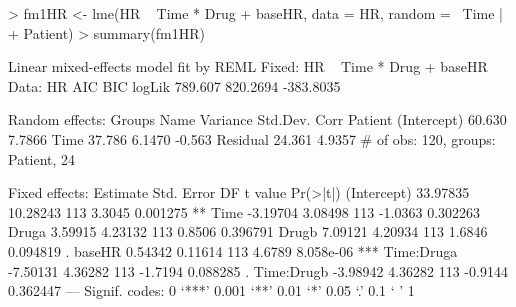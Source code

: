 \documentclass[12pt]{article}
\begin{document}
\begin{Schunk}
\begin{Sinput}
> fm1HR <- lme(HR ~ Time * Drug + baseHR, data = HR, random = ~Time | 
+     Patient)
> summary(fm1HR)
\end{Sinput}
\begin{Soutput}
Linear mixed-effects model fit by REML
Fixed: HR ~ Time * Drug + baseHR 
 Data: HR 
     AIC      BIC    logLik
 789.607 820.2694 -383.8035

Random effects:
 Groups   Name        Variance Std.Dev. Corr   
 Patient  (Intercept) 60.630   7.7866          
          Time        37.786   6.1470   -0.563 
 Residual             24.361   4.9357          
# of obs: 120, groups: Patient, 24

Fixed effects:
             Estimate Std. Error  DF t value  Pr(>|t|)    
(Intercept)  33.97835   10.28243 113  3.3045  0.001275 ** 
Time         -3.19704    3.08498 113 -1.0363  0.302263    
Druga         3.59915    4.23132 113  0.8506  0.396791    
Drugb         7.09121    4.20934 113  1.6846  0.094819 .  
baseHR        0.54342    0.11614 113  4.6789 8.058e-06 ***
Time:Druga   -7.50131    4.36282 113 -1.7194  0.088285 .  
Time:Drugb   -3.98942    4.36282 113 -0.9144  0.362447    
---
Signif. codes:  0 `***' 0.001 `**' 0.01 `*' 0.05 `.' 0.1 ` ' 1 


\end{Soutput}
\end{Schunk}
\end{document}
